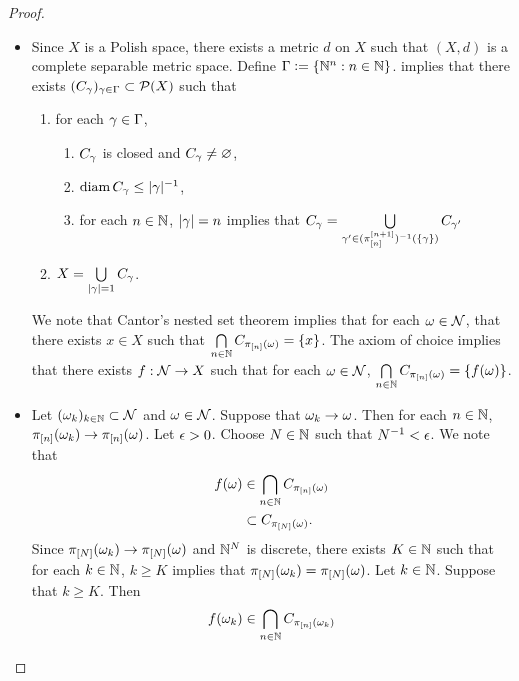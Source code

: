 \documentclass{book}
\begin{document}
	\begin{proof}\
		\begin{itemize}
			\item Since $X$ is a Polish space, there exists a metric $d$ on $X$ such that $(X,d)$ is a complete separable metric space. Define $\Gamma \vcentcolon= \{\mathbb{N}^n: n \in \mathbb{N}\}$.  implies that there exists $(C_{\gamma})_{\gamma \in \Gamma} \subset \mathcal{P}(X)$ such that 
			\begin{enumerate}
				\item for each $\gamma \in \Gamma$,
				\begin{enumerate}
					\item $C_{\gamma}$ is closed and $C_{\gamma} \neq \varnothing$,
					\item $\operatorname{\text{diam}} C_{\gamma} \leq |\gamma|^{-1}$,
					\item for each $n \in \mathbb{N}$, $|\gamma| = n$ implies that $C_{\gamma} = \bigcup\limits_{\gamma' \in (\pi^{[n+1]}_{[n]})^{-1}(\{\gamma\})} C_{\gamma'}$
				\end{enumerate}
				\item $X = \bigcup\limits_{|\gamma| = 1} C_{\gamma}$.
			\end{enumerate} 
			We note that Cantor's nested set theorem  implies that for each $\omega \in \mathcal{N}$, that there exists $x \in X$ such that $\bigcap\limits_{n \in \mathbb{N}} C_{\pi_{[n]}(\omega)} = \{x\}$. The axiom of choice implies that there exists $f:\mathcal{N} \rightarrow X$ such that for each $\omega \in \mathcal{N}$, $\bigcap\limits_{n \in \mathbb{N}} C_{\pi_{[n]}(\omega)} = \{f(\omega)\}$. 
			\item Let $(\omega_k)_{k \in \mathbb{N}} \subset \mathcal{N}$ and $\omega \in \mathcal{N}$. Suppose that $\omega_k \rightarrow \omega$. Then for each $n \in \mathbb{N}$, $\pi_{[n]}(\omega_k) \rightarrow \pi_{[n]}(\omega)$. Let $\epsilon > 0$. Choose $N \in \mathbb{N}$ such that $N^{-1} < \epsilon$. We note that 
			\begin{align*}
				f(\omega) 
				& \in \bigcap\limits_{n \in \mathbb{N}} C_{\pi_{[n]}(\omega)} \\
				& \subset C_{\pi_{[N]}(\omega)}.
			\end{align*}
			Since $\pi_{[N]}(\omega_k) \rightarrow \pi_{[N]}(\omega)$ and $\mathbb{N}^N$ is discrete, there exists $K \in \mathbb{N}$ such that for each $k \in \mathbb{N}$, $k \geq K$ implies that $\pi_{[N]}(\omega_k) = \pi_{[N]}(\omega)$. Let $k \in \mathbb{N}$. Suppose that $k \geq K$. Then
			\begin{align*}
				f(\om_k) 
				& \in \bigcap\limits_{n \in \N} C_{\pi_{[n]}(\om_k)} \\

\end{align*}
\end{itemize}
\end{proof}
\end{document}
